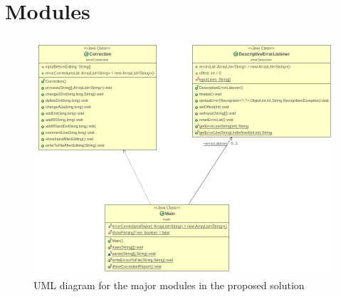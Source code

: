 \section {Modules} 

	\begin{figure}[ht]
	\begin{center}
		\includegraphics[scale=0.5,angle=0]{images/modules.png}
		\caption{UML diagram for the major modules in the proposed solution}
		\label{Fig:UML}
	\end{center}
\end{figure}

